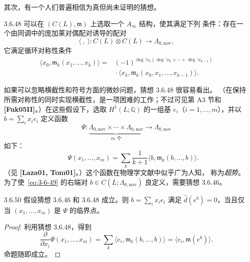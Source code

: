 其次，有一个人们普遍相信为真但尚未证明的猜想。

\begin{conjecture}{3.6.48}\label{conj:3-6-48}
可以在 $(C(L),\mathfrak m)$ 上选取一个 $A_\infty$ 结构，使其满足下列
条件：存在一个由同调中的庞加莱对偶配对诱导的配对
\[
  \langle\ ,\ \rangle\colon
  C(L)\otimes C(L)\longrightarrow\Lambda_{0,\mathrm{nov}},
\]
它满足循环对称性条件
\[
\begin{aligned}
  \langle x_0,\mathfrak m_k(x_1,\ldots,x_k)\rangle
  ={}&(-1)^{\deg' x_k(\deg' x_0+\cdots+\deg' x_{k-1})}\\
  &\mathrel{}\cdot
  \langle x_k,\mathfrak m_k(x_0,x_1,\ldots,x_{k-1})\rangle.
\end{aligned}
\]
\end{conjecture}

如果可以忽略横截性和符号方面的微妙问题，猜想 3.6.48 很容易看出。
（在保持所需对称性的同时实现横截性，是一项困难的工作；不过可见第 A3
节和 \textbf{[Fuk05II]}。）在这些假设下，选取
$H^1(L;\mathbb Q)$ 的一组基 $e_i$（$i=1,\ldots,m$），并以
$b=\sum_i x_i e_i$ 定义函数
\[
  \Psi\colon
  \underbrace{\Lambda_{0,\mathrm{nov}}\times\cdots\times
  \Lambda_{0,\mathrm{nov}}}_{m\text{ 个}}
  \longrightarrow\Lambda_{0,\mathrm{nov}}
\]
如下：
\begin{equation}
  \qquad
  \Psi(x_1,\ldots,x_m)
  =\sum_k\frac{1}{k+1}
  \langle b,\mathfrak m_k(b,\ldots,b)\rangle.
  \tag{3.6.49}\label{eq:3-6-49}
\end{equation}
（见 \textbf{[Laza01, Tom01]}。）这个函数在物理学文献中似乎广为人知，
称为\emph{超势}。为了使~\eqref{eq:3-6-49} 的右端对
$b\in C(L;\Lambda_{0,\mathrm{nov}})$ 良定义，需要猜想 3.6.46。

\begin{proposition}{3.6.50}\label{prop:3-6-50}
假设猜想 3.6.46 和 3.6.48 成立。则 $b=\sum_i x_i e_i$ 满足
$\widehat d(e^b)=0$，当且仅当 $(x_1,\ldots,x_m)$ 是 $\Psi$ 的临界点。
\end{proposition}

\begin{proof}
利用猜想 3.6.48，得到
\[
  \frac{\partial}{\partial x_i}\Psi(x_1,\ldots,x_m)
  =\sum_k\langle e_i,\mathfrak m_k(b,\ldots,b)\rangle
  =\langle e_i,\mathfrak m(e^b)\rangle.
\]
命题随即成立。
\end{proof}

